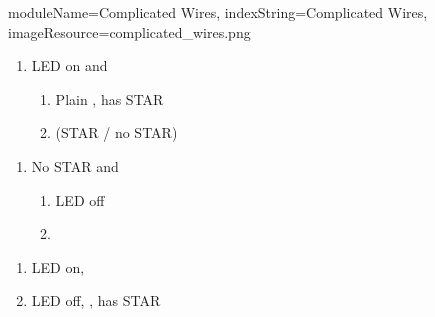 \begin{module}{
  moduleName=Complicated Wires,
  indexString=Complicated Wires,
  imageResource=complicated_wires.png
}
\begin{minipage}[t]{0.48\textwidth}
\begin{enumerate}
  \renewcommand{\labelenumi}{\alph{enumi}.}
  \item LED on and
  \begin{enumerate}
    \renewcommand{\labelenumii}{\roman{enumii}.}
    \item Plain \WHITE, has STAR
    \item \RED (STAR / no STAR)
  \end{enumerate}
\end{enumerate}
\end{minipage}
\hfill
\begin{minipage}[t]{0.48\textwidth}
\begin{enumerate}
  \renewcommand{\labelenumi}{\alph{enumi}.}
  \setcounter{enumi}{2}
  \item No STAR and
  \begin{enumerate}
    \renewcommand{\labelenumii}{\roman{enumii}.}
    \item LED off
    \item \PURPLE
  \end{enumerate}
\end{enumerate}

\begin{enumerate}
  \renewcommand{\labelenumi}{\alph{enumi}.}
  \item LED on, \BLUE
  \item LED off, \PURPLE, has STAR
\end{enumerate}
\end{minipage}

\end{module}

